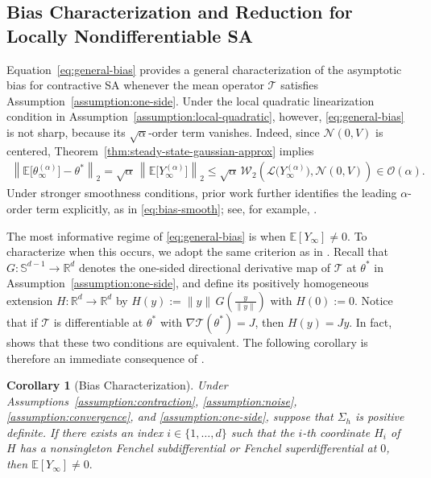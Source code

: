 \documentclass[11pt,letterpaper]{article}
\theoremstyle{plain}
\newtheorem{corollary}{Corollary}
\theoremstyle{definition}
\theoremstyle{remark}
\newcommand{\E}{\mathbb{E}}
\newcommand{\mT}{\mathcal{T}}
\newcommand{\R}{\mathbb{R}}
\newcommand{\W}{\mathcal{W}}
\newcommand{\law}{\mathcal{L}}
\begin{document}
\subsection{Bias Characterization and Reduction for Locally Nondifferentiable SA}
\label{sec:bias}

Equation~\eqref{eq:general-bias} provides a general characterization of the
asymptotic bias for contractive SA whenever the mean operator \(\mT\) satisfies
Assumption~\ref{assumption:one-side}. Under the local quadratic linearization
condition in Assumption~\ref{assumption:local-quadratic}, however,
\eqref{eq:general-bias} is not sharp, because its
\(\sqrt{\alpha}\)-order term vanishes. Indeed, since
\(\mathcal N(0,V)\) is centered, Theorem~\ref{thm:steady-state-gaussian-approx}
implies
\begin{align*}
    \left\|
        \E\bigl[\theta_\infty^{(\alpha)}\bigr]-\theta^*
    \right\|_2=
    \sqrt{\alpha}\,
    \left\|
        \E\bigl[Y_\infty^{(\alpha)}\bigr]
    \right\|_2 \leq
    \sqrt{\alpha}\,
    \W_2\left(
        \law\bigl(Y_\infty^{(\alpha)}\bigr),
        \mathcal N(0,V)
    \right)
    \in
    \mathcal O(\alpha).
\end{align*}
Under stronger smoothness conditions, prior work further identifies the
leading \(\alpha\)-order term explicitly, as in \eqref{eq:bias-smooth}; see,
for example, \cite{dieuleveut2020bridging,zhang2024constant,huo2024collusion}.

The most informative regime of \eqref{eq:general-bias} is when
\(\E[Y_\infty]\neq0\). To characterize when this occurs, we adopt the same
criterion as in \cite{zhang2024prelimit}. Recall that
\(G:\mathbb S^{d-1}\to\R^d\) denotes the one-sided directional derivative map of \(\mT\) at \(\theta^*\) in
Assumption~\ref{assumption:one-side}, and define its positively homogeneous extension \(H:\R^d\to\R^d\) by $H(y):=\|y\|\,G\left(\frac{y}{\|y\|}\right)$ with \(H(0):=0\). Notice that if \(\mT\) is differentiable at \(\theta^*\) with
\(\nabla \mT(\theta^*)=J\), then \(H(y)=Jy\). In fact,
\cite{zhang2024prelimit} shows that these two conditions are equivalent.
The following corollary is therefore an immediate consequence of
\cite[Theorem~3]{zhang2024prelimit}.
\begin{corollary}[Bias Characterization]
\label{co:bias}
Under Assumptions~\ref{assumption:contraction},
\ref{assumption:noise}, \ref{assumption:convergence}, and
\ref{assumption:one-side}, suppose that \(\Sigma_h\) is positive definite.
If there exists an index \(i\in\{1,\ldots,d\}\) such that the \(i\)-th
coordinate \(H_i\) of \(H\) has a nonsingleton Fenchel subdifferential or Fenchel
superdifferential at \(0\), then $\E[Y_\infty]\neq 0.$
\end{corollary}
\end{document}
